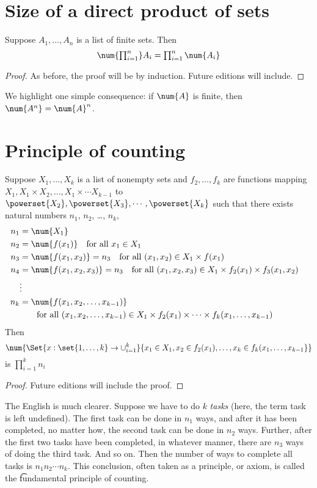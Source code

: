 
\section*{Size of a direct product of sets}

\begin{proposition}
Suppose $A_1, \dots , A_n$ is a list of finite sets.
Then
\[
\textstyle
\num{\prod_{i = 1}^{n}} A_i = \prod_{i = 1}^{n} \num{A_i}
\]
\end{proposition}

\begin{proof}As before, the proof will be by induction. Future editions will include.\end{proof}
We highlight one simple consequence: if $\num{A}$ is finite, then $\num{A^n} = \num{A}^n$.
\section*{Principle of counting}

\begin{proposition}
Suppose $X_1, \dots , X_k$ is a list of nonempty sets and $f_2, \dots , f_k$ are functions mapping $X_1, X_1 \times  X_2, \dots , X_1 \times  \cdots X_{k-1}$ to $\powerset{X_2}, \powerset{X_3}, \cdots, \powerset{X_k}$ such that there exists natural numbers $n_1$, $n_2$, \dots , $n_k$,
\[
\begin{aligned}
n_1 &= \num{X_1} \\
n_2 &= \num{f(x_1)} \quad \text{for all } x_1 \in X_1 \\
n_3 &= \num{f(x_1, x_2)} = n_3 \quad \text{for all } (x_1, x_2) \in X_1 \times  f(x_1) \\
n_4 &= \num{f(x_1, x_2, x_3)} = n_3 \quad \text{for all } (x_1, x_2, x_3) \in X_1 \times  f_2(x_1) \times  f_3(x_1, x_2) \\
&\vdots&\\
n_k &= \num{f(x_1, x_2, \dots , x_{k-1})} \quad \\& \quad\quad \text{for all } (x_1, x_2, \dots , x_{k-1}) \in X_1 \times f_2(x_1) \times  \cdots \times  f_k(x_1, \dots , x_{k-1}) \\
\end{aligned}
\]
Then
\[
\num{\Set{x: \set{1, \dots , k} \to \cup_{i = 1}^{k}}{x_1 \in X_1, x_2 \in f_2(x_1), \dots , x_k \in f_k(x_1, \dots , x_{k-1}}}
\]
is $\prod_{i = 1}^{k} n_i$
\end{proposition}

\begin{proof}Future editions will include the proof.\end{proof}
The English is much clearer.
Suppose we have to do $k$ \textit{tasks} (here, the term task is left undefined).
The first task can be done in $n_1$ ways, and after it has been completed, no matter how, the second task can be done in $n_2$ ways.
Further, after the first two tasks have been completed, in whatever manner, there are $n_3$ ways of doing the third task.
And so on.
Then the number of ways to complete all tasks is $n_1 n_2 \cdots n_k$.
This conclusion, often taken as a principle, or axiom, is called the \t{fundamental principle of counting}.

